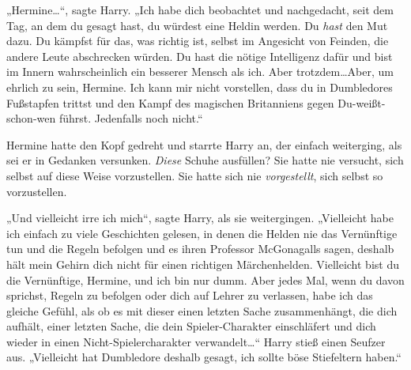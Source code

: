 „Hermine…“, sagte Harry. „Ich habe dich beobachtet und nachgedacht, seit dem Tag, an dem du gesagt hast, du würdest eine Heldin werden. Du \emph{hast} den Mut dazu. Du kämpfst für das, was richtig ist, selbst im Angesicht von Feinden, die andere Leute abschrecken würden. Du hast die nötige Intelligenz dafür und bist im Innern wahrscheinlich ein besserer Mensch als ich. Aber trotzdem…Aber, um ehrlich zu sein, Hermine. Ich kann mir nicht vorstellen, dass du in Dumbledores Fußstapfen trittst und den Kampf des magischen Britanniens gegen Du-weißt-schon-wen führst. Jedenfalls noch nicht.“

Hermine hatte den Kopf gedreht und starrte Harry an, der einfach weiterging, als sei er in Gedanken versunken. \emph{Diese} Schuhe ausfüllen? Sie hatte nie versucht, sich selbst auf diese Weise vorzustellen. Sie hatte sich nie \emph{vorgestellt}, sich selbst so vorzustellen.

„Und vielleicht irre ich mich“, sagte Harry, als sie weitergingen. „Vielleicht habe ich einfach zu viele Geschichten gelesen, in denen die Helden nie das Vernünftige tun und die Regeln befolgen und es ihren Professor McGonagalls sagen, deshalb hält mein Gehirn dich nicht für einen richtigen Märchenhelden. Vielleicht bist du die Vernünftige, Hermine, und ich bin nur dumm. Aber jedes Mal, wenn du davon sprichst, Regeln zu befolgen oder dich auf Lehrer zu verlassen, habe ich das gleiche Gefühl, als ob es mit dieser einen letzten Sache zusammenhängt, die dich aufhält, einer letzten Sache, die dein Spieler-Charakter einschläfert und dich wieder in einen Nicht-Spielercharakter verwandelt…“ Harry stieß einen Seufzer aus. „Vielleicht hat Dumbledore deshalb gesagt, ich sollte böse Stiefeltern haben.“

